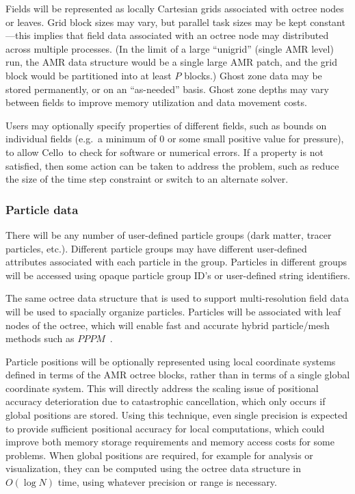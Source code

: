 \documentclass[11pt,letterpaper]{article}
\newcommand{\cello}{\textsf{Cello}}
\begin{document}
Fields will be represented as locally Cartesian grids associated with
octree nodes or leaves.  Grid block sizes may vary, but parallel task
sizes may be kept constant---this implies that field data associated
with an octree node may distributed across multiple processes.  (In
the limit of a large ``unigrid'' (single AMR level) run, the AMR data
structure would be a single large AMR patch, and the grid block would
be partitioned into at least $P$ blocks.)  Ghost zone data may be
stored permanently, or on an ``as-needed'' basis.  Ghost zone depths
may vary between fields to improve memory utilization and data movement
costs.

Users may optionally specify properties of different fields, such as
bounds on individual fields (e.g.~a minimum of $0$ or some small
positive value for pressure), to allow \cello\ to check for software
or numerical errors.   
If a property is not satisfied, then some action can be taken to
address the problem, such as reduce the size of the time step
constraint or switch to an alternate solver.

\subsubsection{Particle data} \label{sss:design-particles}

There will be any number of user-defined particle groups (dark matter,
tracer particles, etc.).  Different particle groups may have different
user-defined attributes associated with each particle in the group.
Particles in different groups will be accessed using opaque particle
group ID's or user-defined string identifiers.

The same octree data structure that is used to support
multi-resolution field data will be used to spacially organize
particles.  Particles will be associated with leaf nodes of the
octree, which will enable fast and accurate hybrid particle/mesh
methods such as $PPPM$~\cite{HoEa88}.

Particle positions will be optionally represented using local
coordinate systems defined in terms of the AMR octree blocks, rather
than in terms of a single global coordinate system.
This will directly address the scaling issue of positional accuracy
deterioration due to catastrophic cancellation, which only occurs if
global positions are stored.  Using this technique, even single
precision is expected to provide sufficient positional accuracy for
local computations, which could improve both memory storage
requirements and memory access costs for some problems.  When global
positions are required, for example for analysis or visualization,
they can be computed using the octree data structure in $O(\log N)$
time, using whatever precision or range is necessary.
\end{document}
